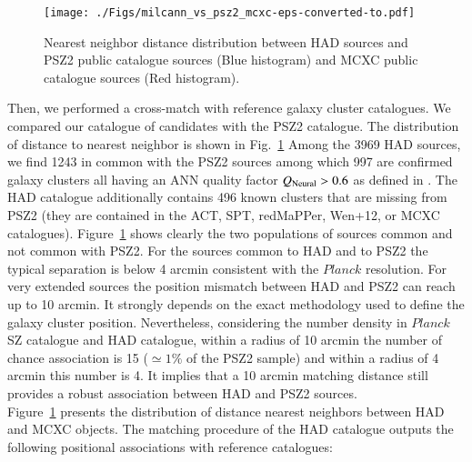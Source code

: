 \documentclass[traditabstract,a4,twocolumn]{aa}
\begin{document}
\begin{figure}[!th]
\begin{center}
\texttt{[image: ./Figs/milcann\_vs\_psz2\_mcxc-eps-converted-to.pdf]}
\caption{Nearest neighbor distance distribution between HAD sources and PSZ2 public catalogue sources (Blue histogram) and MCXC public catalogue sources (Red histogram).}
\label{psz2}
\end{center}
\end{figure}


Then, we performed a cross-match with reference galaxy cluster catalogues.  We compared our catalogue of candidates with the
  PSZ2 catalogue. The distribution of distance to nearest neighbor is shown in Fig.~\ref{psz2}
 Among the 3969 HAD sources, we find 1243 in common with
  the PSZ2 sources among which 997 are confirmed galaxy clusters all having an ANN quality factor $Q_{\rm Neural} > 0.6$ as defined in
    \citet{agh14}.  The HAD catalogue additionally contains 496 known
  clusters that are missing from PSZ2 (they are contained in the ACT, SPT,
  redMaPPer, Wen+12, or MCXC catalogues). Figure~\ref{psz2} shows
  clearly the two populations of sources common and not common with PSZ2. For the
  sources common to HAD and to PSZ2 the typical separation is below 4 arcmin consistent with the $Planck$ resolution.  For very extended sources the position mismatch between HAD and PSZ2 can reach up to 10 arcmin. It strongly depends on the
  exact methodology used to define the galaxy cluster
  position. Nevertheless, considering the number density in $Planck$ SZ
  catalogue and HAD catalogue, within a radius of 10 arcmin the number of
  chance association is 15 ($\simeq 1\%$ of the PSZ2 sample) and within a radius of 4
  arcmin this number is 4. It implies that a 10 arcmin matching distance still provides a robust association between HAD and PSZ2 sources.\\
  Figure~\ref{psz2} presents the distribution of distance nearest neighbors between HAD and MCXC objects.
 The matching procedure of the HAD catalogue outputs the following positional associations with reference catalogues:
\end{document}
